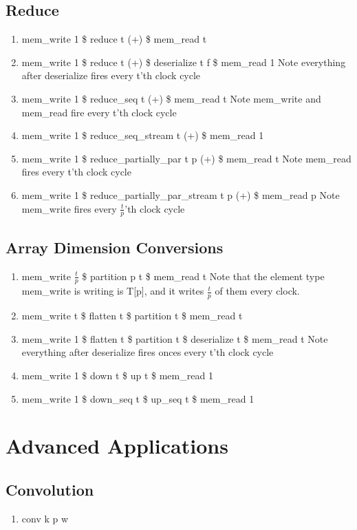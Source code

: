 \documentclass[11pt,fleqn]{article}
\numberwithin{equation}{subsection}
\begin{document}
\subsection{Reduce}
\begin{enumerate}
    \item mem\_write 1 \$ reduce t (+) \$ mem\_read t
    \item mem\_write 1 \$ reduce t (+) \$ deserialize t f \$ mem\_read 1 
        \subitem Note everything after deserialize fires every t'th clock cycle
    \item mem\_write 1 \$ reduce\_seq t (+) \$ mem\_read t
        \subitem Note mem\_write and mem\_read fire every t'th clock cycle
    \item mem\_write 1 \$ reduce\_seq\_stream t (+) \$ mem\_read 1
    \item mem\_write 1 \$ reduce\_partially\_par t p (+) \$ mem\_read t
        \subitem Note mem\_read fires every t'th clock cycle
    \item mem\_write 1 \$ reduce\_partially\_par\_stream t p (+) \$ mem\_read p
        \subitem Note mem\_write fires every $\frac{t}{p}$'th clock cycle
\end{enumerate}

\subsection{Array Dimension Conversions}
\begin{enumerate}
    \item mem\_write $\frac{t}{p}$ \$ partition p t \$ mem\_read t
        \subitem Note that the element type mem\_write is writing is T[p], 
        and it writes $\frac{t}{p}$ of them every clock.
    \item mem\_write t \$ flatten t \$ partition t \$ mem\_read t 
    \item mem\_write 1 \$ flatten t \$ partition t \$ deserialize t \$ mem\_read t
        \subitem Note everything after deserialize fires onces every t'th 
        clock cycle
    \item mem\_write 1 \$ down t \$ up t \$ mem\_read 1
    \item mem\_write 1 \$ down\_seq t \$ up\_seq t \$ mem\_read 1
\end{enumerate}

\section{Advanced Applications}
\subsection{Convolution}
\begin{enumerate}
    \item conv k p w
\end{enumerate}
\end{document}
